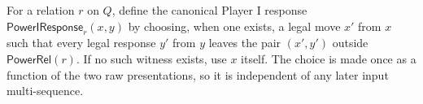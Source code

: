 \begin{definition}
For a relation $r$ on $Q$, define the canonical Player I response
$\mathsf{PowerIResponse}_r(x,y)$ by choosing, when one exists, a legal move
$x'$ from $x$ such that every legal response $y'$ from $y$ leaves the pair
$(x',y')$ outside $\mathsf{PowerRel}(r)$.  If no such witness exists, use
$x$ itself.  The choice is made once as a function of the two raw
presentations, so it is independent of any later input multi-sequence.
\end{definition}
